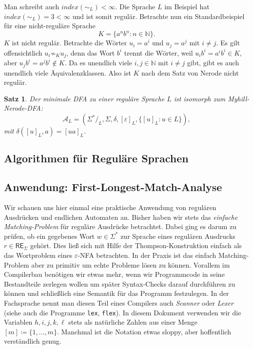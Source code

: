 \documentclass[11pt, a4paper]{article}
\theoremstyle{definition}
\theoremstyle{plain}
\newtheorem{theorem}[definition]{Satz}
\numberwithin{equation}{section}
\begin{document}
Man schreibt auch \( index(\sim_L) < \infty \). Die Sprache \( L \) im Beispiel hat \( index(\sim_L) = 3 < \infty \) und ist somit regulär. Betrachte nun ein Standardbeispiel für eine nicht-reguläre Sprache 
\[
	K = \{ a^n b^n : n \in \mathbb{N} \}.
\]
\( K \) ist nicht regulär. Betrachte die Wörter \( u_i = a^i \) und \( u_j = a^j \) mit \( i \neq j \). Es gilt offensichtlich \( u_i \not\sim_K u_j \), denn das Wort \( b^i \) trennt die Wörter, weil \( u_i b^i = a^i b^i \in K \), aber \( u_j b^i = a^j b^i \notin K \). Da es unendlich viele \( i, j \in \mathbb{N} \) mit \( i \neq j \) gibt, gibt es auch unendlich viele Äquivalenzklassen. Also ist \( K \) nach dem Satz von Nerode nicht regulär.
\begin{theorem}
	Der minimale DFA zu einer reguläre Sprache \( L \) ist isomorph zum Myhill-Nerode-DFA:
	\[
		\mathcal{A}_L = (\Sigma^\ast/_L, \Sigma, \delta, [\varepsilon]_L, \{[u]_L : u \in L \}),
	\]
	mit \( \delta([u]_L, a) = [ua]_L \).
\end{theorem}


\subsection{Algorithmen für Reguläre Sprachen}\label{sec:regular_algorithms}


\subsection{Anwendung: First-Longest-Match-Analyse}\label{sec:regular_first-longest-match}
Wir schauen uns hier einmal eine praktische Anwendung von regulären Ausdrücken und endlichen Automaten an. Bisher haben wir stets das \textit{einfache Matching-Problem} für reguläre Ausdrücke betrachtet. Dabei ging es darum zu prüfen, ob ein gegebenes Wort \( w \in \Sigma^\ast \) zur Sprache eines regulären Ausdrucks \( r \in \mathsf{RE}_\Sigma \) gehört. Dies ließ sich mit Hilfe der Thompson-Konstruktion einfach als das Wortproblem eines \(\varepsilon\)-NFA betrachten. In der Praxis ist das einfach Matching-Problem aber zu primitiv um echte Probleme lösen zu können. Vorallem im Compilerbau benötigen wir etwas mehr, wenn wir Programmcode in seine Bestandteile zerlegen wollen um später Syntax-Checks darauf durchführen zu können und schließlich eine Semantik für das Programm festzulegen. In der Fachsprache nennt man diesen Teil eines Compilers auch \textit{Scanner} oder \textit{Lexer} (siehe auch die Programme \texttt{lex}, \texttt{flex}).
In diesem Dokument verwenden wir die Variablen \( h, i, j, k, \ell \) stets als natürliche Zahlen aus einer Menge \( [m] \coloneqq \{ 1, \ldots, m \} \). Manchmal ist die Notation etwas sloppy, aber hoffentlich verständlich genug.
\end{document}
